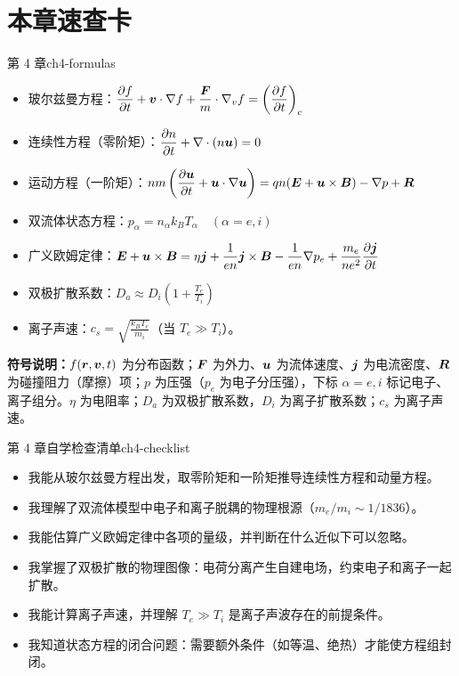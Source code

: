 \section*{本章速查卡}
{}
\begin{formulabox}{第 4 章}{ch4-formulas}
\begin{itemize}[leftmargin=*,itemsep=0pt]
\item 玻尔兹曼方程：$\displaystyle\frac{\partial f}{\partial t} + \bm{v}\cdot\nabla f + \frac{\bm{F}}{m}\cdot\nabla_v f = \left(\frac{\partial f}{\partial t}\right)_c$
\item 连续性方程（零阶矩）：$\displaystyle\frac{\partial n}{\partial t} + \nabla\cdot(n\bm{u}) = 0$
\item 运动方程（一阶矩）：$\displaystyle nm\left(\frac{\partial\bm{u}}{\partial t} + \bm{u}\cdot\nabla\bm{u}\right) = qn(\bm{E}+\bm{u}\times\bm{B}) - \nabla p + \bm{R}$
\item 双流体状态方程：$\displaystyle p_\alpha = n_\alpha k_{\!B}T_\alpha\quad(\alpha=e,i)$
\item 广义欧姆定律：$\displaystyle\bm{E} + \bm{u}\times\bm{B} = \eta\bm{j} + \frac{1}{en}\bm{j}\times\bm{B} - \frac{1}{en}\nabla p_e + \frac{m_e}{ne^2}\frac{\partial\bm{j}}{\partial t}$
\item 双极扩散系数：$\displaystyle D_a \approx D_i\left(1 + \frac{T_e}{T_i}\right)$
\item 离子声速：$\displaystyle c_s = \sqrt{\frac{k_{\!B}T_e}{m_i}}$（当 $T_e\gg T_i$）。
\end{itemize}
\textbf{符号说明：}$f(\bm{r},\bm{v},t)$ 为分布函数；$\bm{F}$ 为外力、$\bm{u}$ 为流体速度、$\bm{j}$ 为电流密度、$\bm{R}$ 为碰撞阻力（摩擦）项；$p$ 为压强（$p_e$ 为电子分压强），下标 $\alpha=e,i$ 标记电子、离子组分。$\eta$ 为电阻率；$D_a$ 为双极扩散系数，$D_i$ 为离子扩散系数；$c_s$ 为离子声速。
\end{formulabox}

\begin{checklistbox}{第 4 章自学检查清单}{ch4-checklist}
\begin{itemize}[leftmargin=*,label=$\square$]
\item 我能从玻尔兹曼方程出发，取零阶矩和一阶矩推导连续性方程和动量方程。
\item 我理解了双流体模型中电子和离子脱耦的物理根源（$m_e/m_i\sim 1/1836$）。
\item 我能估算广义欧姆定律中各项的量级，并判断在什么近似下可以忽略。
\item 我掌握了双极扩散的物理图像：电荷分离产生自建电场，约束电子和离子一起扩散。
\item 我能计算离子声速，并理解 $T_e\gg T_i$ 是离子声波存在的前提条件。
\item 我知道状态方程的闭合问题：需要额外条件（如等温、绝热）才能使方程组封闭。
\end{itemize}
\end{checklistbox}


\endinput
